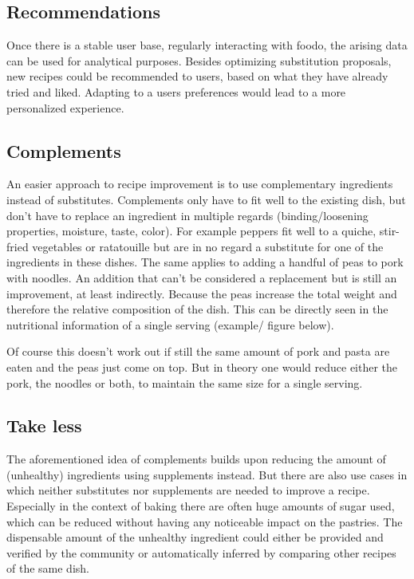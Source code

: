 \subsection{Recommendations}
Once there is a stable user base, regularly interacting with foodo, the arising data can be used for analytical purposes. Besides optimizing substitution proposals, new recipes could be recommended to users, based on what they have already tried and liked. Adapting to a users preferences would lead to a more personalized experience.

\subsection{Complements}
An easier approach to recipe improvement is to use complementary ingredients instead of substitutes. Complements only have to fit well to the existing dish, but don't have to replace an ingredient in multiple regards (binding/loosening properties, moisture, taste, color). 
For example peppers fit well to a quiche, stir-fried vegetables or ratatouille but are in no regard a substitute for one of the ingredients in these dishes. The same applies to adding a handful of peas to pork with noodles. An addition that can’t be considered a replacement but is still an improvement, at least indirectly. Because the peas increase the total weight and therefore the relative composition of the dish. This can be directly seen in the nutritional information of a single serving (example/ figure below). 

Of course this doesn’t work out if still the same amount of pork and pasta are eaten and the peas just come on top. But in theory one would reduce either the pork, the noodles or both, to maintain the same size for a single serving.

\subsection{Take less}
The aforementioned idea of complements builds upon reducing the amount of (unhealthy) ingredients using supplements instead. But there are also use cases in which neither substitutes nor supplements are needed to improve a recipe. Especially in the context of baking there are often huge amounts of sugar used, which can be reduced without having any noticeable impact on the pastries. The dispensable amount of the unhealthy ingredient could either be provided and verified by the community or automatically inferred by comparing other recipes of the same dish.

